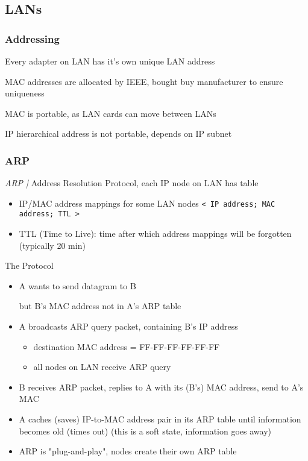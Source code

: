 \documentclass{article}
\newcommand{\define}[1]{\noindent\textit{#1 |}}
\begin{document}
\subsection{LANs}

\subsubsection*{Addressing}

Every adapter on LAN has it's own unique LAN address

\noindent MAC addresses are allocated by IEEE, bought buy manufacturer to ensure uniqueness

\noindent MAC is portable, as LAN cards can move between LANs

\noindent IP hierarchical address is not portable, depends on IP subnet

\subsubsection*{ARP}

\define{ARP} Address Resolution Protocol, each IP node on LAN has table
\begin{itemize}
	\item IP/MAC address mappings for some LAN nodes \verb|< IP address; MAC address; TTL >|
	\item TTL (Time to Live): time after which address mappings will be forgotten (typically 20 min)
\end{itemize}

\noindent The Protocol
\begin{itemize}
	\item A wants to send datagram to B
	
	but B's MAC address not in A's ARP table
	
	\item A broadcasts ARP query packet, containing B's IP address
	\begin{itemize}
		\item destination MAC address = FF-FF-FF-FF-FF-FF
		\item all nodes on LAN receive ARP query
	\end{itemize}
	\item B receives ARP packet, replies to A with its (B's) MAC address, send to A's MAC
	\item A caches (saves) IP-to-MAC address pair in its ARP table until information becomes old (times out) (this is a soft state, information goes away)
	
	\item ARP is "plug-and-play", nodes create their own ARP table
\end{itemize}
\end{document}
